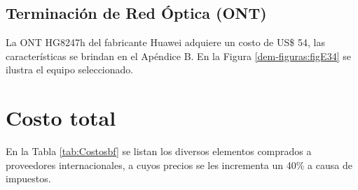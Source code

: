 \subsection{Terminación de Red Óptica (ONT)}
La ONT HG8247h del fabricante Huawei adquiere un costo de US\$ 54, las características se brindan en el Apéndice B. En la Figura \ref{dem-figuras:figE34} se ilustra el equipo seleccionado.

\section{Costo total}

En la Tabla \ref{tab:Costosbf} se listan los diversos elementos comprados a proveedores internacionales, a cuyos precios se les incrementa un 40\% a causa de impuestos.



